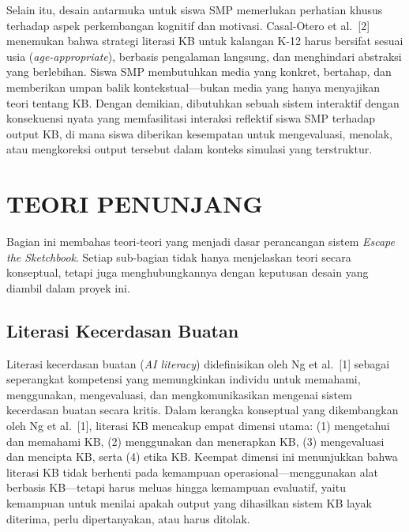 \documentclass[10pt,twoside,openright]{report}
\begin{document}
Selain itu, desain antarmuka untuk siswa SMP memerlukan perhatian khusus terhadap aspek perkembangan kognitif dan motivasi. Casal-Otero et al.\ [2] menemukan bahwa strategi literasi KB untuk kalangan K-12 harus bersifat sesuai usia (\textit{age-appropriate}), berbasis pengalaman langsung, dan menghindari abstraksi yang berlebihan. Siswa SMP membutuhkan media yang konkret, bertahap, dan memberikan umpan balik kontekstual---bukan media yang hanya menyajikan teori tentang KB. Dengan demikian, dibutuhkan sebuah sistem interaktif dengan konsekuensi nyata yang memfasilitasi interaksi reflektif siswa SMP terhadap output KB, di mana siswa diberikan kesempatan untuk mengevaluasi, menolak, atau mengkoreksi output tersebut dalam konteks simulasi yang terstruktur.

\section{TEORI PENUNJANG}
\label{sec:teori-penunjang}

Bagian ini membahas teori-teori yang menjadi dasar perancangan sistem \textit{Escape the Sketchbook}. Setiap sub-bagian tidak hanya menjelaskan teori secara konseptual, tetapi juga menghubungkannya dengan keputusan desain yang diambil dalam proyek ini.

\subsection{Literasi Kecerdasan Buatan}
\label{subsec:literasi-kb}

Literasi kecerdasan buatan (\textit{AI literacy}) didefinisikan oleh Ng et al.\ [1] sebagai seperangkat kompetensi yang memungkinkan individu untuk memahami, menggunakan, mengevaluasi, dan mengkomunikasikan mengenai sistem kecerdasan buatan secara kritis. Dalam kerangka konseptual yang dikembangkan oleh Ng et al.\ [1], literasi KB mencakup empat dimensi utama: (1) mengetahui dan memahami KB, (2) menggunakan dan menerapkan KB, (3) mengevaluasi dan mencipta KB, serta (4) etika KB. Keempat dimensi ini menunjukkan bahwa literasi KB tidak berhenti pada kemampuan operasional---menggunakan alat berbasis KB---tetapi harus meluas hingga kemampuan evaluatif, yaitu kemampuan untuk menilai apakah output yang dihasilkan sistem KB layak diterima, perlu dipertanyakan, atau harus ditolak.
\end{document}
